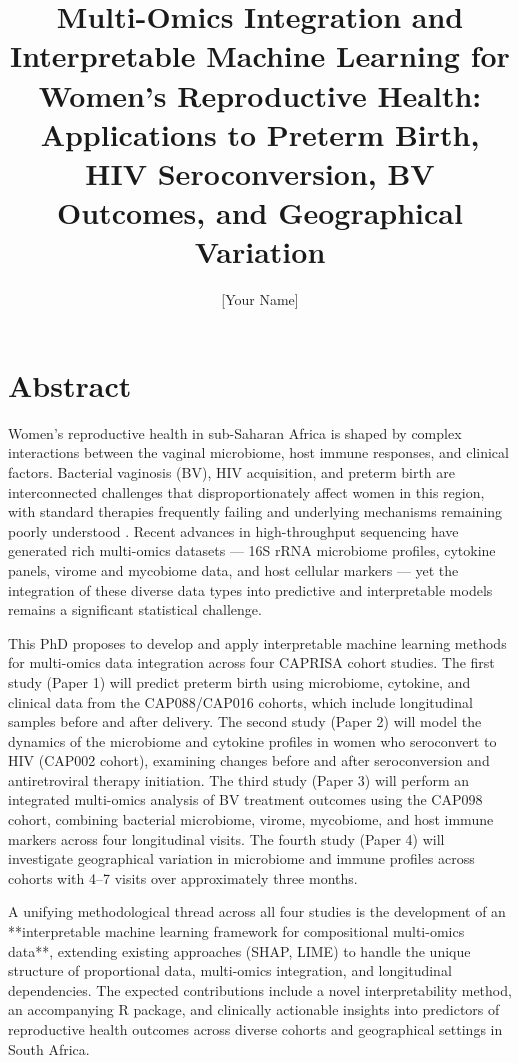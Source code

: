 \documentclass[12pt,a4paper]{report}
\title{\textbf{Multi-Omics Integration and Interpretable Machine Learning for Women's Reproductive Health: Applications to Preterm Birth, HIV Seroconversion, BV Outcomes, and Geographical Variation}}
\author{[Your Name]}
\date{}
\begin{document}
\maketitle
\tableofcontents
\newpage

\chapter*{Abstract}

Women's reproductive health in sub-Saharan Africa is shaped by complex interactions between the vaginal microbiome, host immune responses, and clinical factors. Bacterial vaginosis (BV), HIV acquisition, and preterm birth are interconnected challenges that disproportionately affect women in this region, with standard therapies frequently failing and underlying mechanisms remaining poorly understood \cite{bradshaw2016current, gosmann2017lactobacillus, barnabas2018converging}. Recent advances in high-throughput sequencing have generated rich multi-omics datasets --- 16S rRNA microbiome profiles, cytokine panels, virome and mycobiome data, and host cellular markers --- yet the integration of these diverse data types into predictive and interpretable models remains a significant statistical challenge.

This PhD proposes to develop and apply interpretable machine learning methods for multi-omics data integration across four CAPRISA cohort studies. The first study (Paper 1) will predict preterm birth using microbiome, cytokine, and clinical data from the CAP088/CAP016 cohorts, which include longitudinal samples before and after delivery. The second study (Paper 2) will model the dynamics of the microbiome and cytokine profiles in women who seroconvert to HIV (CAP002 cohort), examining changes before and after seroconversion and antiretroviral therapy initiation. The third study (Paper 3) will perform an integrated multi-omics analysis of BV treatment outcomes using the CAP098 cohort, combining bacterial microbiome, virome, mycobiome, and host immune markers across four longitudinal visits. The fourth study (Paper 4) will investigate geographical variation in microbiome and immune profiles across cohorts with 4--7 visits over approximately three months.

A unifying methodological thread across all four studies is the development of an **interpretable machine learning framework for compositional multi-omics data**, extending existing approaches (SHAP, LIME) to handle the unique structure of proportional data, multi-omics integration, and longitudinal dependencies. The expected contributions include a novel interpretability method, an accompanying R package, and clinically actionable insights into predictors of reproductive health outcomes across diverse cohorts and geographical settings in South Africa.
\end{document}
